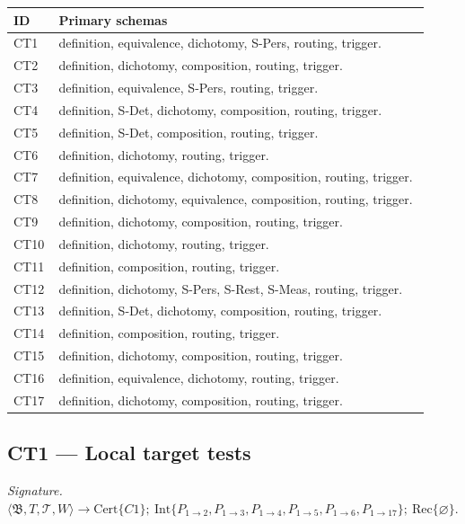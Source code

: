 \documentclass[
  11pt,
]{article}
\theoremstyle{definition}
\newcommand{\ctsignature}[1]{\par\noindent\emph{Signature.}\ #1\par\medskip}
\newcommand{\ctcert}[1]{\mathrm{Cert}\{#1\}}
\newcommand{\ctint}[1]{\mathrm{Int}\{#1\}}
\newcommand{\ctrec}[1]{\mathrm{Rec}\{#1\}}
\newcommand{\ctnone}{\varnothing}
\begin{document}
\begingroup
\scriptsize
\setlength{\tabcolsep}{2pt}
\begin{longtable}[]{@{}
  >{\raggedright\arraybackslash}p{0.08\linewidth}
  >{\raggedright\arraybackslash}p{0.84\linewidth}@{}}
\toprule\noalign{}
ID & Primary schemas \\
\midrule\noalign{}
\endhead
\bottomrule\noalign{}
\endlastfoot
CT1 & definition, equivalence, dichotomy, S-Pers, routing, trigger. \\
CT2 & definition, dichotomy, composition, routing, trigger. \\
CT3 & definition, equivalence, S-Pers, routing, trigger. \\
CT4 & definition, S-Det, dichotomy, composition, routing, trigger. \\
CT5 & definition, S-Det, composition, routing, trigger. \\
CT6 & definition, dichotomy, routing, trigger. \\
CT7 & definition, equivalence, dichotomy, composition, routing, trigger. \\
CT8 & definition, dichotomy, equivalence, composition, routing, trigger. \\
CT9 & definition, dichotomy, composition, routing, trigger. \\
CT10 & definition, dichotomy, routing, trigger. \\
CT11 & definition, composition, routing, trigger. \\
CT12 & definition, dichotomy, S-Pers, S-Rest, S-Meas, routing, trigger. \\
CT13 & definition, S-Det, dichotomy, composition, routing, trigger. \\
CT14 & definition, composition, routing, trigger. \\
CT15 & definition, dichotomy, composition, routing, trigger. \\
CT16 & definition, equivalence, dichotomy, routing, trigger. \\
CT17 & definition, dichotomy, composition, routing, trigger. \\
\end{longtable}
\endgroup
\subsection{CT1 --- Local target tests}\label{ct:1}\label{target-predicate-and-local-tests}
\ctsignature{\(\langle\mathfrak B,T,\mathcal T,W\rangle \to
\ctcert{C1};\allowbreak\ \ctint{P_{1\to2},\allowbreak P_{1\to3},\allowbreak P_{1\to4},\allowbreak P_{1\to5},\allowbreak P_{1\to6},\allowbreak P_{1\to17}};\allowbreak\ \ctrec{\ctnone}\).}
\end{document}
